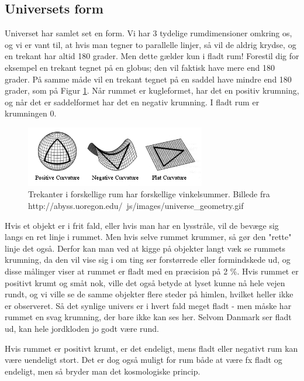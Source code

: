 \subsection{Universets form}

Universet har samlet set en form. Vi har 3 tydelige rumdimensioner omkring os, og vi er vant til, at hvis man tegner to parallelle linjer, så vil de aldrig krydse, og en trekant har altid 180 grader. Men dette gælder kun i fladt rum! Forestil dig for eksempel en trekant tegnet på en globus; den vil faktisk have mere end 180 grader. På samme måde vil en trekant tegnet på en saddel have mindre end 180 grader, som på Figur \ref{shapes}. Når rummet er kugleformet, har det en positiv krumning, og når det er saddelformet har det en negativ krumning. I fladt rum er krumningen 0.

\begin{figure}[h!]
\centering
\includegraphics[width=0.7\textwidth]{Astrofysik/Astrofig/universe_geometry.png}
\caption{Trekanter i forskellige rum har forskellige vinkelsummer. Billede fra http://abyss.uoregon.edu/~js/images/universe\_geometry.gif}
\label{shapes}
\end{figure}

Hvis et objekt er i frit fald, eller hvis man har en lysstråle, vil de bevæge sig langs en ret linje i rummet. Men hvis selve rummet krummer, så gør den "rette" linje det også. Derfor kan man ved at kigge på objekter langt væk se rummets krumning, da den vil vise sig i om ting ser forstørrede eller formindskede ud, og disse målinger viser at rummet er fladt med en præcision på 2 \%. %
Hvis rummet er positivt krumt og småt nok, ville det også betyde at lyset kunne nå hele vejen rundt, og vi ville se de samme objekter flere steder på himlen, hvilket heller ikke er observeret. Så det synlige univers er i hvert fald meget fladt - men måske har rummet en svag krumning, der bare ikke kan ses her. Selvom Danmark ser fladt ud, kan hele jordkloden jo godt være rund.

Hvis rummet er positivt krumt, er det endeligt, mens fladt eller negativt rum kan være uendeligt stort. Det er dog også muligt for rum både at være fx fladt og endeligt, men så bryder man det kosmologiske princip.


